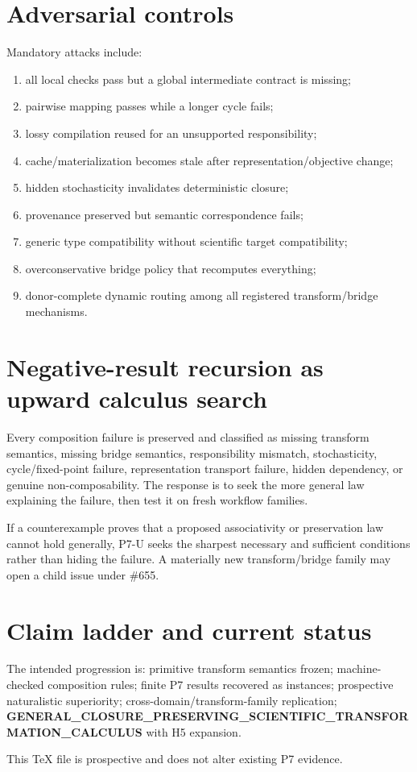 \documentclass[11pt]{article}
\begin{document}
\section{Adversarial controls}
Mandatory attacks include:
\begin{enumerate}
    \item all local checks pass but a global intermediate contract is missing;
    \item pairwise mapping passes while a longer cycle fails;
    \item lossy compilation reused for an unsupported responsibility;
    \item cache/materialization becomes stale after representation/objective change;
    \item hidden stochasticity invalidates deterministic closure;
    \item provenance preserved but semantic correspondence fails;
    \item generic type compatibility without scientific target compatibility;
    \item overconservative bridge policy that recomputes everything;
    \item donor-complete dynamic routing among all registered transform/bridge mechanisms.
\end{enumerate}

\section{Negative-result recursion as upward calculus search}
Every composition failure is preserved and classified as missing transform semantics, missing bridge semantics, responsibility mismatch, stochasticity, cycle/fixed-point failure, representation transport failure, hidden dependency, or genuine non-composability. The response is to seek the more general law explaining the failure, then test it on fresh workflow families.

If a counterexample proves that a proposed associativity or preservation law cannot hold generally, P7-U seeks the sharpest necessary and sufficient conditions rather than hiding the failure. A materially new transform/bridge family may open a child issue under \#655.

\section{Claim ladder and current status}
The intended progression is: primitive transform semantics frozen; machine-checked composition rules; finite P7 results recovered as instances; prospective naturalistic superiority; cross-domain/transform-family replication; \textbf{GENERAL_CLOSURE_PRESERVING_SCIENTIFIC_TRANSFORMATION_CALCULUS} with H5 expansion.

This TeX file is prospective and does not alter existing P7 evidence.
\end{document}
